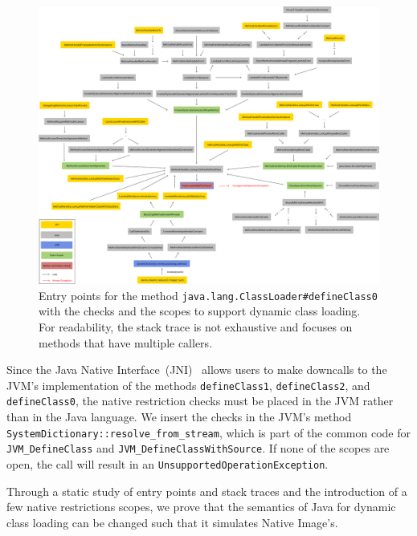 \begin{figure}
    \centering
    \includegraphics[angle=90,origin=c,scale=0.34]{resources/Group 413.png}
    \caption{Entry points for the method \texttt{java.lang.ClassLoader\#defineClass0} with the checks and the scopes to support dynamic class loading. For readability, the stack trace is not exhaustive and focuses on methods that have multiple callers.}
    \label{fig:define_class_0}
\end{figure}

Since the Java Native Interface~(JNI)~\cite{noauthor_jni_nodate} allows users to make downcalls to the JVM's implementation of the methods \verb|defineClass1|, \verb|defineClass2|, and \verb|defineClass0|, the native restriction checks must be placed in the JVM rather than in the Java language. We insert the checks in the JVM's method \verb|SystemDictionary::resolve_from_stream|, which is part of the common code for \verb|JVM_DefineClass| and \verb|JVM_DefineClassWithSource|. If none of the scopes are open, the call will result in an \verb|UnsupportedOperationException|. 

Through a static study of entry points and stack traces and the introduction of a few native restrictions scopes, we prove that the semantics of Java for dynamic class loading can be changed such that it simulates Native Image's.

